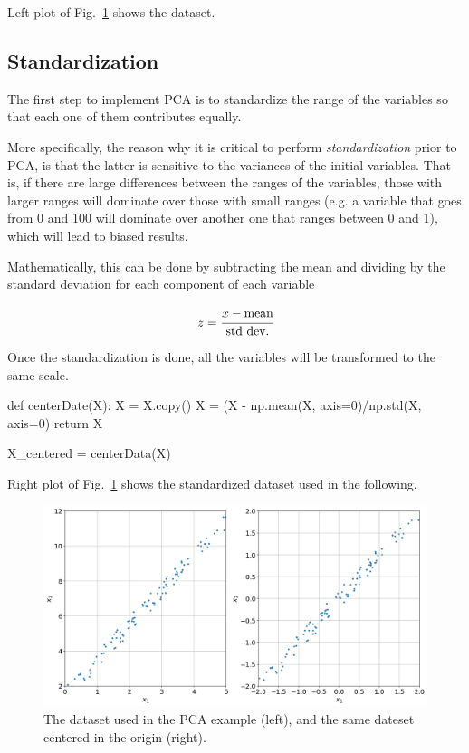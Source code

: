 Left plot of Fig.~\ref{fig:pca_dataset} shows the dataset.

\subsection{Standardization}
The first step to implement PCA is to standardize the range of the variables so that each one of them contributes equally.

More specifically, the reason why it is critical to perform \emph{standardization} prior to PCA, is that the latter is sensitive to the variances of the initial variables. That is, if there are large differences between the ranges of the variables, those with larger ranges will dominate over those with small ranges (e.g. a variable that goes from 0 and 100 will dominate over another one that ranges between 0 and 1), which will lead to biased results. 

Mathematically, this can be done by subtracting the mean and dividing by the standard deviation for each component of each variable

\begin{equation}
z = \cfrac{x - \textrm{mean}}{\textrm{std dev.}}
\end{equation}

Once the standardization is done, all the variables will be transformed to the same scale.

\begin{ipython}
def centerDate(X):
    X = X.copy()
    X = (X - np.mean(X, axis=0)/np.std(X, axis=0)
    return X
    
X_centered = centerData(X)
\end{ipython}

Right plot of Fig.~\ref{fig:pca_dataset} shows the standardized dataset used in the following.

\begin{figure}[htb]
	\centering
	\includegraphics[width=0.9\linewidth]{figures/pca_dataset_both}
	\caption{The dataset used in the PCA example (left), and the same dateset centered in the origin (right).}
	\label{fig:pca_dataset}
\end{figure}

